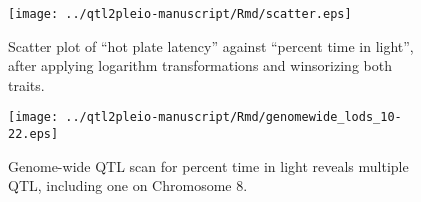 \documentclass[oneside]{book}
\begin{document}
\begin{appendices}
\clearpage


\renewcommand{\thefigure}{\textbf{S\arabic{figure}}}
\setcounter{figure}{0}

\begin{figure}
\texttt{[image: ../qtl2pleio-manuscript/Rmd/scatter.eps]}
\caption{Scatter plot of ``hot plate latency'' against ``percent time in
  light'', after applying logarithm transformations and winsorizing
  both traits.}
\label{fig:scatter}
\end{figure}


\begin{figure}
\texttt{[image: ../qtl2pleio-manuscript/Rmd/genomewide\_lods\_10-22.eps]}
\caption{Genome-wide QTL scan for percent time in light reveals
  multiple QTL, including one on Chromosome 8.}
\label{fig:genomewide10-22}
\end{figure}



\end{appendices}
\end{document}
